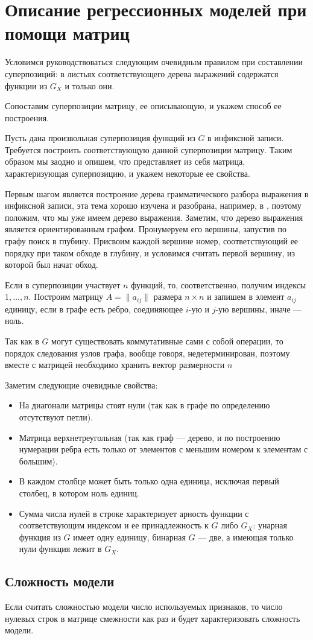 \documentclass[12pt,a4paper]{amsart}
\begin{document}
\section{Описание регрессионных моделей при помощи матриц}

Условимся руководствоваться следующим очевидным правилом при составлении суперпозиций: в листьях соответствующего дерева выражений содержатся функции из $G_X$ и только они.

Сопоставим суперпозиции матрицу, ее описывающую, и укажем способ ее построения.

Пусть дана произвольная суперпозиция функций из $G$ в инфиксной записи. Требуется построить соответствующую данной суперпозиции матрицу. Таким образом мы заодно и опишем, что представляет из себя матрица, характеризующая суперпозицию, и укажем некоторые ее свойства.

Первым шагом является построение дерева грамматического разбора выражения в инфиксной записи, эта тема хорошо изучена и разобрана, например, в \cite{Aho86}, поэтому положим, что мы уже имеем дерево выражения. Заметим, что дерево выражения является ориентированным графом. Пронумеруем его вершины, запустив по графу поиск в глубину. Присвоим каждой вершине номер, соответствующий ее порядку при таком обходе в глубину, и условимся считать первой вершину, из которой был начат обход.

Если в суперпозиции участвует $n$ функций, то, соответственно, получим индексы $1, \dots, n$. Построим матрицу $A = \| a_{ij} \|$ размера $n \times n$ и запишем в элемент $a_{ij}$ единицу, если в графе есть ребро, соединяющее $i$-ую и $j$-ую вершины, иначе --- ноль.

Так как в $G$ могут существовать коммутативные сами с собой операции, то порядок следования узлов графа, вообще говоря, недетерминирован, поэтому вместе с матрицей необходимо хранить вектор размерности $n$ 

Заметим следующие очевидные свойства:

\begin{itemize}
  \item На диагонали матрицы стоят нули (так как в графе по определению отсутствуют петли).
  \item Матрица верхнетреугольная (так как граф --- дерево, и по построению нумерации ребра есть только от элементов с меньшим номером к элементам с большим).
  \item В каждом столбце может быть только одна единица, исключая первый столбец, в котором ноль единиц.
  \item Сумма числа нулей в строке характеризует арность функции с соответствующим индексом и ее принадлежность к $G$ либо $G_X$: унарная функция из $G$ имеет одну единицу, бинарная $G$ --- две, а имеющая только нули функция лежит в $G_X$.
\end{itemize}

\subsection{Сложность модели}

Если считать сложностью модели число используемых признаков, то число нулевых строк в матрице смежности как раз и будет характеризовать сложность модели.


\extrasrussian

\end{document}
